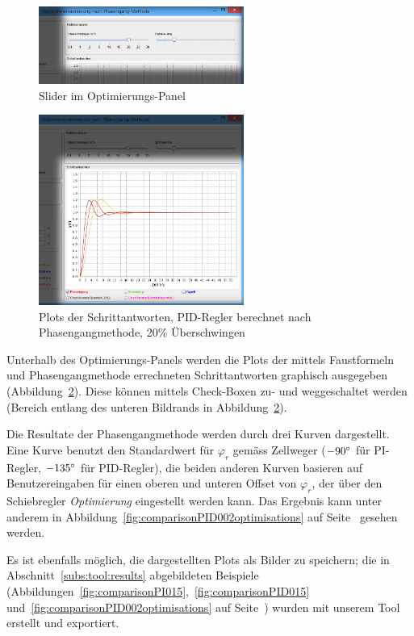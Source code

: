 \begin{figure}[h!, width=\pagewidth]
    \centering
    \includegraphics[width=0.6\textwidth]{images/tool20UeberschwingenPIDOptimierungen.jpg}
    \caption{Slider im Optimierungs-Panel}
    \label{fig:optimierungen}
\end{figure}

\begin{figure}[h!, width=\pagewidth]
    \centering
    \includegraphics[width=0.6\textwidth]{images/tool20UeberschwingenPIDPlots.jpg}
    \caption{Plots der Schrittantworten, PID-Regler berechnet nach Phasengangmethode, 20\% \"Uberschwingen}
    \label{fig:tool20Plots}
\end{figure}

Unterhalb des  Optimierungs-Panels werden  die Plots der  mittels Faustformeln
und  Phasengangmethode   errechneten  Schrittantworten   graphisch  ausgegeben
(Abbildung~\ref{fig:tool20Plots}). Diese  k\"onnen   mittels  Check-Boxen  zu-
und   weggeschaltet  werden   (Bereich  entlang   des  unteren   Bildrands  in
Abbildung~\ref{fig:tool20Plots}).

Die Resultate der Phasengangmethode werden durch drei Kurven dargestellt. Eine
Kurve   benutzt  den   Standardwert  f\"ur   $\varphi_r$  gem\"ass   Zellweger
($-90\degree$  f\"ur PI-Regler,  $-135\degree$ f\"ur  PID-Regler), die  beiden
anderen Kurven  basieren auf Benutzereingaben  f\"ur einen oberen  und unteren
Offset  von  $\varphi_r$,  der   \"uber  den  Schiebregler  \emph{Optimierung}
eingestellt       werden       kann. Das       Ergebnis       kann       unter
anderem      in     Abbildung~\ref{fig:comparisonPID002optimisations}      auf
Seite~\pageref{fig:comparisonPI015} gesehen werden.

Es   ist   ebenfalls   m\"oglich,   die   dargestellten   Plots   als   Bilder
zu   speichern;   die    in   Abschnitt~\ref{subs:tool:results}   abgebildeten
Beispiele   (Abbildungen~\ref{fig:comparisonPI015},~\ref{fig:comparisonPID015}
und~\ref{fig:comparisonPID002optimisations} auf Seite~\pageref{fig:comparisonPI015})
wurden mit unserem Tool erstellt und exportiert.

\clearpage
